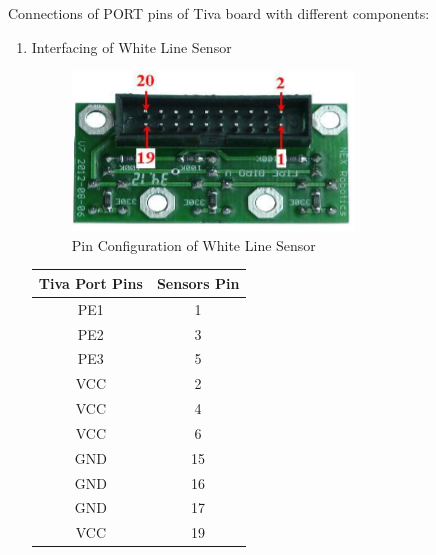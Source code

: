 \documentclass[a4paper,12pt,oneside]{book}
\begin{document}
Connections of PORT pins of Tiva board with different components:\\
\begin {enumerate}
\item Interfacing of White Line Sensor
\begin{center}
	\begin{figure}[h]
		\centering
		\includegraphics[scale=1]{whiteline_pin}
		\caption{Pin Configuration of White Line Sensor}
	\end{figure}
	
	\begin{tabular}{| c | c |}
		
		\hline
		\textbf{Tiva Port Pins} & \textbf{Sensors Pin}\\
		
		\hline
		PE1 & 1\\
		\hline
		PE2 & 3\\
		\hline
		PE3 & 5 \\
		\hline
		VCC & 2\\
		\hline
		VCC & 4 \\
		\hline
		VCC & 6 \\
		\hline
		GND & 15\\
		\hline
		GND & 16\\
		\hline
		GND & 17\\
		\hline
		VCC & 19 \\
		\hline
	\end{tabular}
\end{center}



\end{enumerate}
\end{document}
